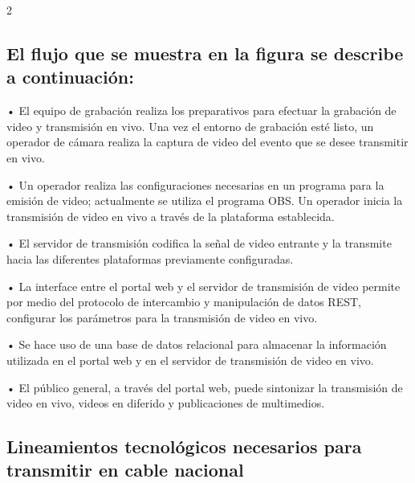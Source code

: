 \documentclass[12pt,spanish,Letterpaper,openany]{book}
\newcommand{\spacesixmilis}{\vspace{6mm}}
\newcommand{\spacethreemilis}{\vspace{3mm}}
\newcommand{\spacetwomilis}{\vspace{2mm}}
\begin{document}
\begin {multicols}{2}

\spacesixmilis
\spacesixmilis

\hypertarget{el-flujo-que-se-muestra-en-la-figura-se-describe-a-continuacion}{%
\subsection{El flujo que se muestra en la figura se describe a continuación:}\label{el-flujo-que-se-muestra-en-la-figura-se-describe-a-continuacion}}

\spacetwomilis

• El equipo de grabación realiza los preparativos para efectuar la grabación de video y transmisión en vivo. Una vez el entorno de grabación esté listo, un operador de cámara realiza la captura de video del evento que se desee transmitir en vivo.

• Un operador realiza las configuraciones necesarias en un programa para la emisión de video; actualmente se utiliza el programa OBS. Un operador inicia la transmisión de video en vivo a través de la plataforma establecida.

• El servidor de transmisión codifica la señal de video entrante y la transmite hacia las diferentes plataformas previamente configuradas.

• La interface entre el portal web y el servidor de transmisión de video permite por medio del protocolo de intercambio y manipulación de datos REST, configurar los parámetros para la transmisión de video en vivo.

• Se hace uso de una base de datos relacional para almacenar la información utilizada en el portal web y en el servidor de transmisión de video en vivo.

\spacesixmilis

• El público general, a través del portal web, puede sintonizar la transmisión de video en vivo, videos en diferido y publicaciones de multimedios.

\spacethreemilis

\hypertarget{lineamientos-tecnologicos-necesarios-para-transmitir-en-cable-nacional}{%
\subsection{Lineamientos tecnológicos necesarios para transmitir en cable nacional}\label{lineamientos-tecnologicos-necesarios-para-transmitir-en-cable-nacional}}

\spacethreemilis


\end{multicols}
\end{document}
